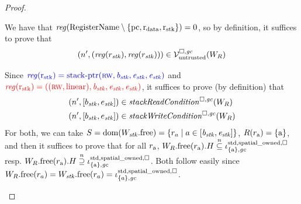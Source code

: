 \documentclass[a4paper]{article}
\begin{document}
\begin{proof}
\begin{itemize}
    We have that $\reg(\RegName \setminus \{\pcreg,\rdata,\rstk\}) = 0$, so by definition, it suffices to prove that
    \begin{equation*}
      \npair[n']{(\reg(r_\stk),\reg(r_\stk))} \in \lrv(W_R)
    \end{equation*}

    Since $\src{\reg(\rstk) = \stkptr{\rw,\baddr_\stk,\eaddr_\stk,\eaddr_\stk}}$ and $\trg{\reg(\rstk) = ((\rw,\linear),\baddr_\stk,\eaddr_\stk,\eaddr_\stk)}$, it suffices to prove (by definition) that
    \begin{align*}
      \npair[n']{[b_\stk,e_\stk]} &\in \stackReadCond{W_R}\\
      \npair[n']{[b_\stk,e_\stk]} &\in \stackWriteCond{W_R}
    \end{align*}
    For both, we can take $S = \dom(\pwfree[W_\stk]) = \{r_a \mid a \in [\baddr_\stk,\eaddr_\stk]\}$, $R(r_\addr) = \{\addr\}$, and then it suffices to prove that for all $r_\addr$, $\pwfree[W_R](r_\addr).H \nsubeq \stdreg{\{\addr\},\gc}{\spatialo}$ resp. $\pwfree[W_R](r_\addr).H \nsupeq \stdreg{\{\addr\},\gc}{\spatialo}$.
    Both follow easily since 
    $\pwfree[W_R](r_a) = \pwfree[W_\stk](r_a) = \stdreg{\{a\},\gc}{\spatialo}$.
  \end{itemize}
\end{proof}
\end{document}
